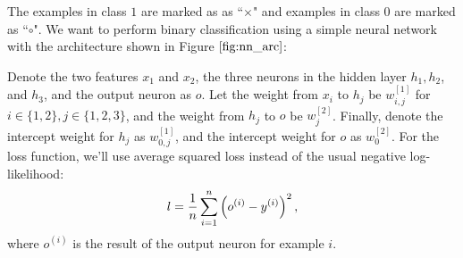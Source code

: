 The examples in class $1$ are marked as as ``$\times$" and examples in class $0$ are marked as ``$\circ$". We want to perform binary classification using a simple neural network with the architecture shown in Figure $\ref{fig:nn_arc}$:

Denote the two features $x_1$ and $x_2$, the three neurons in the hidden layer $h_1, h_2$, and $h_3$, and the output neuron as $o$. Let the weight from $x_i$ to $h_j$ be $w_{i, j}^{[1]}$ for $i \in \{1, 2\}, j \in \{1, 2, 3\}$, and the weight from $h_j$ to $o$ be $w_{j}^{[2]}$. Finally, denote the intercept weight for $h_j$ as $w_{0, j}^{[1]}$, and the intercept weight for $o$ as $w_{0}^{[2]}$. For the loss function, we'll use average squared loss instead of the usual negative log-likelihood:
$$l = \frac{1}{{n}}\sum_{i=1}^{{n}} \left(o^{(i)} - y^{(i)}\right)^2,$$
where $o^{(i)}$ is the result of the output neuron for example $i$.

\begin{enumerate}
  

\ifnum{} {
  
} \fi

  

\ifnum{} {
  
} \fi

  
\ifnum{} {
  
} \fi


\end{enumerate}
